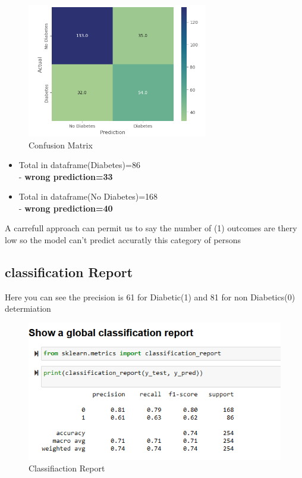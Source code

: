 
\begin{figure}[htp]
    \centering
    \includegraphics[width=0.7\textwidth]{images/confusion.png}
    \caption{Confusion Matrix }
    \label{fig:example5}
\end{figure}

\begin{itemize}
    \item Total in dataframe(Diabetes)=86\\
    - \textbf{wrong prediction=33}
    \item  Total in dataframe(No Diabetes)=168\\
    - \textbf{wrong prediction=40}
\end{itemize}
  

    
 A carrefull approach can permit us to say the number of (1) outcomes are thery 
 low so the model can't predict accuratly this category of persons 

 \newpage

 \subsection{classification Report}
 \label{sec:classification Report}

Here you can see the precision is 61 for Diabetic(1) and 81 for non Diabetics(0) determiation
\begin{figure}[htp]
    \centering
    \includegraphics[width=1.2\textwidth]{images/report.png}
    \caption{Classifiaction Report }
    \label{fig:example5}
\end{figure}

